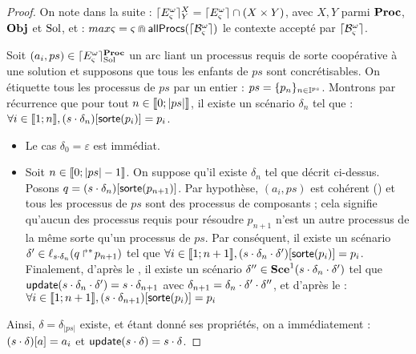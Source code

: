 \begin{proof} %
  On note dans la suite :
  $\lceil E_\varsigma^\omega\rceil^{X}_{Y} = \lceil E_\varsigma^\omega\rceil \cap (X \times Y)$, avec $X, Y$ parmi $\mathbf{Proc}$, $\mathbf{Obj}$ et $\mathrm{Sol}$,
  et : $max\varsigma = \varsigma \Cap \mathsf{allProcs}(\lceil \mathcal{B}_\varsigma^\omega\rceil)$ le contexte accepté par $\lceil \mathcal{B}_\varsigma^\omega\rceil$.
  
  Soit $(a_i, ps) \in \lceil E_\varsigma^\omega\rceil^{\mathbf{Proc}}_{\mathrm{Sol}}$ un arc liant un processus requis de sorte coopérative à
  une solution et supposons que tous les enfants de $ps$ sont concrétisables.
  On étiquette tous les processus de $ps$ par un entier : $ps = \{ p_n \}_{n \in \mathbb{I}^{ps}}$.
  Montrons par récurrence que pour tout $n \in \mathopen{\llbracket}0\mathclose{};|ps|\mathclose{\rrbracket}$,
  il existe un scénario $\delta_n$ tel que :
  $\forall i \in \mathopen{\llbracket}1\mathclose{};n\mathclose{\rrbracket}, {(s \cdot \delta_n)[\mathsf{sorte}(p_i)]} = p_i$.
  \begin{itemize}
    \item Le cas $\delta_0 = \varepsilon$ est immédiat.
    \item Soit $n \in \mathopen{\llbracket}0\mathclose{};|ps| - 1\mathclose{\rrbracket}$.
      On suppose qu'il existe $\delta_n$ tel que décrit ci-dessus.
      Posons $q = {(s \cdot \delta_n)[\mathsf{sorte}(p_{n+1})]}$.
      Par hypothèse, $(a_i, ps)$ est cohérent () et tous les processus
      de $ps$ sont des processus de composants ;
      cela signifie qu'aucun des processus requis pour résoudre $p_{n+1}$ n'est un autre processus
      de la même sorte qu'un processus de $ps$.
      Par conséquent, il existe un scénario
      $\delta' \in \ell_{s \cdot \delta_n}(\mbox{$q\Rsh^*\!p_{n+1}$})$
      tel que $\forall i \in \mathopen{\llbracket}1\mathclose{};n+1\mathclose{\rrbracket},
        {(s \cdot \delta_n \cdot \delta')[\mathsf{sorte}(p_{i})]} = p_{i}$.
      Finalement, d'après le , il existe un scénario
      $\delta'' \in \mathbf{Sce}^1(s \cdot \delta_n \cdot \delta')$
      tel que $\mathsf{update}(s \cdot \delta_n \cdot \delta') = s \cdot \delta_{n+1}$
      avec $\delta_{n+1} = \delta_n \cdot \delta' \cdot \delta''$,
      et d'après le  :
      $\forall i \in \mathopen{\llbracket}1\mathclose{};n+1\mathclose{\rrbracket}, {(s \cdot \delta_{n+1})[\mathsf{sorte}(p_i)]} = p_i$
  \end{itemize}
  Ainsi, $\delta = \delta_{|ps|}$ existe, et étant donné ses propriétés, on a immédiatement :
  ${(s \cdot \delta)[a]} = a_i$ et $\mathsf{update}(s \cdot \delta) = s \cdot \delta$.
  

\end{proof}
